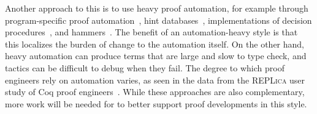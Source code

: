 Another approach to this is to use heavy proof automation, for example through
program-specific proof automation~\cite{Chlipala:2013:CPD:2584504},
hint databases~\cite{coq-intro}, implementations of decision procedures~\cite{Pugh1991},
and hammers~\cite{Blanchette2016b, Blanchette2013, Kaliszyk2014, Czajka2018}.
The benefit of an automation-heavy style is that this localizes the burden of change to the automation itself.
On the other hand, heavy automation can produce terms that are large and slow to type check,
and tactics can be difficult to debug when they fail.
The degree to which proof engineers rely on automation varies, as seen in the data from the
\textsc{REPLica} user study of Coq proof engineers~\cite{replica}.
While these approaches are also complementary, more work will be needed for \toolname to better support 
proof developments in this style.



